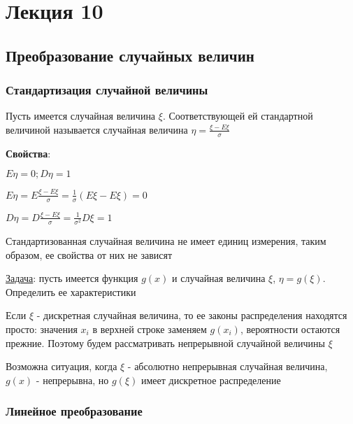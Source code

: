 \documentclass[12pt]{article}
\begin{document}
    \section{Лекция 10}

    \hypertarget{randomvaluetransformation}{}

    \subsection{Преобразование случайных величин}

    \hypertarget{standardizationofrandomvalue}{}

    \subsubsection{Стандартизация случайной величины}

    \Def Пусть имеется случайная величина $\xi$. Соответствующей ей стандартной величиной называется
    случайная величина $\eta = \frac{\xi - E\xi}{\sigma}$

    \textbf{Свойства}:

    $E\eta = 0; D\eta = 1$

    \begin{MyProof}
        $E\eta = E \frac{\xi - E\xi}{\sigma} = \frac{1}{\sigma} (E\xi - E\xi) = 0$

        $D\eta = D \frac{\xi - E\xi}{\sigma} = \frac{1}{\sigma^2} D\xi = 1$
    \end{MyProof}

    Стандартизованная случайная величина не имеет единиц измерения, таким образом, ее свойства от них не зависят

    \mediumvspace

    \underline{Задача}: пусть имеется функция $g(x)$ и случайная величина $\xi$, $\eta = g(\xi)$. Определить ее характеристики

    \Nota Если $\xi$ - дискретная случайная величина, то ее законы распределения находятся просто: значения $x_i$ в верхней строке заменяем $g(x_i)$, вероятности остаются прежние.
    Поэтому будем рассматривать непрерывной случайной величины $\xi$

    \Notas Возможна ситуация, когда $\xi$ - абсолютно непрерывная случайная величина, $g(x)$ - непрерывна, но $g(\xi)$ имеет дискретное распределение

    \subsubsection{Линейное преобразование}
\end{document}
